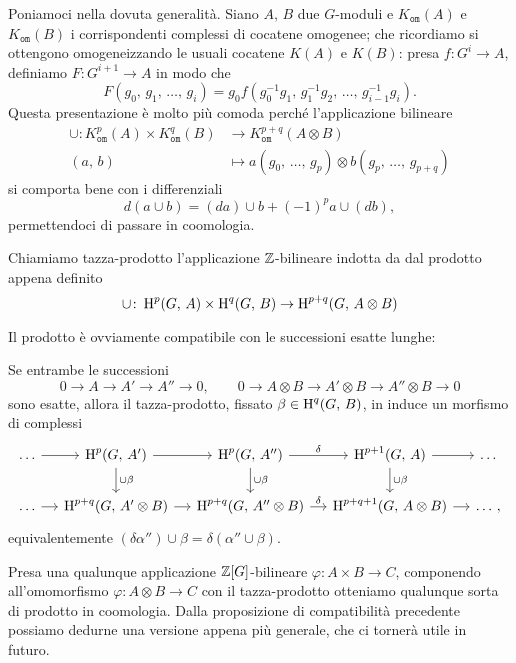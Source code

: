 Poniamoci nella dovuta generalità. Siano $ A, \, B $ due $ G $-moduli e $ K_{\mathtt{om}}(A) $ e $ K_{\mathtt{om}}(B) $ i corrispondenti complessi di cocatene omogenee; che ricordiamo si ottengono omogeneizzando le usuali cocatene $ K(A) $ e $ K(B) $: presa $ f \colon G^i \to A $, definiamo $ F\colon G^{i+1} \to A  $ in modo che
\[ F(g_0, \, g_1, \, \dots, \, g_i) = g_0 f(g_0^{-1}g_1, \, g_1^{-1}g_2, \, \dots, \, g_{i-1}^{-1}g_i). \]
Questa presentazione è molto più comoda perché l'applicazione bilineare
\begin{align*}
	\cup \colon K^p_{\mathtt{om}}(A) \times K^q_{\mathtt{om}}(B) &\to K_{\mathtt{om}}^{p+q}(A \otimes B)\\
	(a, \, b) & \mapsto a(g_0,\, \dots, \, g_p) \otimes b(g_p,\, \dots, \, g_{p+q})
\end{align*}
si comporta bene con i differenziali
\[ d(a \cup b) = (da) \cup b + (-1)^p a \cup (db), \]
permettendoci di passare in coomologia.

\begin{definition}
	Chiamiamo tazza-prodotto l'applicazione $ \mathbb{Z} $-bilineare indotta da dal prodotto appena definito
	\[ \cup \colon \operatorname{H}^p(G, \, A) \times \operatorname{H}^q(G, \, B) \to \operatorname{H}^{p+q}(G, \, A \otimes B)  \]
\end{definition}

Il prodotto è ovviamente compatibile con le successioni esatte lunghe:

\begin{proposition}\label{cup1} 
	Se entrambe le successioni
	\[ 0 \to A \to A' \to A'' \to 0, \qquad 0 \to A \otimes B \to A'\otimes B \to A''\otimes B \to 0 \]
	sono esatte, allora il tazza-prodotto, fissato $ \beta \in \operatorname{H}^q(G, \, B) $, in induce un morfismo di complessi
	\[\begin{tikzcd}[column sep = small]
	\dots \rar
	& \HH^{p}(G, \, A') \dar["\cup\beta"] \rar 
	& \HH^{p}(G, \, A'') \rar["\delta"] \dar["\cup\beta"]
	& \HH^{p+1}(G, \, A) \rar \dar["\cup\beta"]
	&\dots  \\
	\dots \rar
	& \HH^{p+q}(G, \, A'\otimes B) \rar
	& \HH^{p+q}(G, \, A''\otimes B) \rar["\delta"]
	& \HH^{p+q+1}(G, \, A\otimes B) \rar &\dots \, , \end{tikzcd}\]
	equivalentemente $ (\delta\alpha'') \cup \beta = \delta (\alpha'' \cup \beta) $.
\end{proposition}

Presa una qualunque applicazione $ \mathbb{Z}[G] $-bilineare $ \varphi\colon A \times B \to C $, componendo all'omomorfismo $ \varphi\colon A \otimes B \to C  $ con il tazza-prodotto otteniamo qualunque sorta di prodotto in coomologia. Dalla proposizione di compatibilità precedente possiamo dedurne una versione appena più generale, che ci tornerà utile in futuro.

